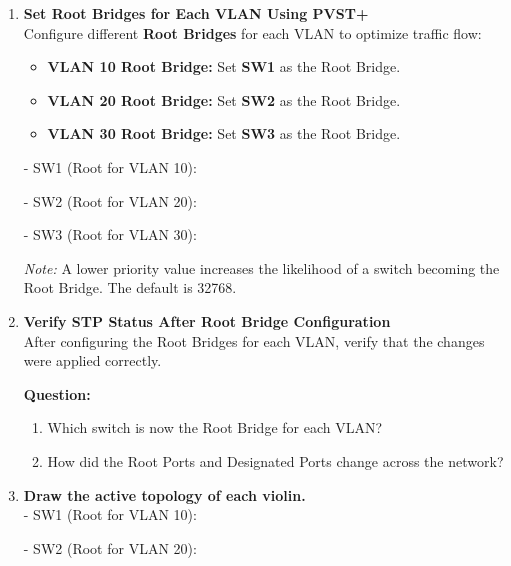 \documentclass[a4paper]{book}
\begin{document}
\begin{enumerate}

    \item \textbf{Set Root Bridges for Each VLAN Using PVST+} \\
    Configure different \textbf{Root Bridges} for each VLAN to optimize traffic flow:

    \begin{itemize}
        \item \textbf{VLAN 10 Root Bridge:} Set \textbf{SW1} as the Root Bridge.
        \item \textbf{VLAN 20 Root Bridge:} Set \textbf{SW2} as the Root Bridge.
        \item \textbf{VLAN 30 Root Bridge:} Set \textbf{SW3} as the Root Bridge.
    \end{itemize}

 

    - SW1 (Root for VLAN 10):


    - SW2 (Root for VLAN 20):


    - SW3 (Root for VLAN 30):


    \textit{Note:} A lower priority value increases the likelihood of a switch becoming the Root Bridge. The default is 32768.

    \item \textbf{Verify STP Status After Root Bridge Configuration} \\
    After configuring the Root Bridges for each VLAN, verify that the changes were applied correctly.


    \textbf{Question:}
    \begin{enumerate}
        \item Which switch is now the Root Bridge for each VLAN?
        \item How did the Root Ports and Designated Ports change across the network?
    \end{enumerate}
\newpage
    \item \textbf{Draw the active topology of each violin.} \\
    - SW1 (Root for VLAN 10):


    - SW2 (Root for VLAN 20):



\end{enumerate}
\end{document}
